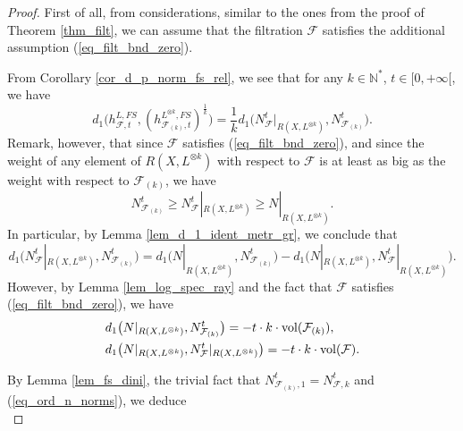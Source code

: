 \documentclass[12pt]{article}
\numberwithin{equation}{section}
\theoremstyle{theorem}
\theoremstyle{definition}
\theoremstyle{remark}
\newcommand{\nat}{\mathbb{N}}
\begin{document}
	\begin{proof}
		First of all, from considerations, similar to the ones from the proof of Theorem \ref{thm_filt}, we can assume that the filtration $\mathcal{F}$ satisfies the additional assumption (\ref{eq_filt_bnd_zero}).
		\par 
		From Corollary \ref{cor_d_p_norm_fs_rel}, we see that for any $k \in \nat^*$, $t \in [0, +\infty[$, we have
		\begin{equation}\label{eq_cont_bergm_1}
			d_1 \big( h^{L, FS}_{\mathcal{F}, t}, (h^{L^{\otimes k}, FS}_{\mathcal{F}_{(k)}, t})^{\frac{1}{k}} \big)
			=
			\frac{1}{k}
			d_1 \big( N^t_{\mathcal{F}}|_{R(X, L^{\otimes k})}, N^t_{\mathcal{F}_{(k)}} \big).
		\end{equation}
		Remark, however, that since $\mathcal{F}$ satisfies (\ref{eq_filt_bnd_zero}), and since the weight of any element of $R(X, L^{\otimes k})$ with respect to $\mathcal{F}$ is at least as big as the weight with respect to $\mathcal{F}_{(k)}$, we have
		\begin{equation}\label{eq_ord_n_norms}
			N^t_{\mathcal{F}_{(k)}} \geq N^t_{\mathcal{F}}|_{R(X, L^{\otimes k})} \geq N|_{R(X, L^{\otimes k})}.
		\end{equation}
		In particular, by Lemma \ref{lem_d_1_ident_metr_gr}, we conclude that 
		\begin{equation}\label{eq_cont_bergm_2}
			d_1 \big( N^t_{\mathcal{F}}|_{R(X, L^{\otimes k})}, N^t_{\mathcal{F}_{(k)}} \big)
			=
			d_1 \big( N|_{R(X, L^{\otimes k})}, N^t_{\mathcal{F}_{(k)}} \big)
			-
			d_1 \big( N|_{R(X, L^{\otimes k})}, N^t_{\mathcal{F}}|_{R(X, L^{\otimes k})} \big).
		\end{equation}
		However, by Lemma \ref{lem_log_spec_ray} and the fact that $\mathcal{F}$ satisfies (\ref{eq_filt_bnd_zero}), we have
		\begin{equation}\label{eq_cont_bergm_3}
		\begin{aligned}
			&
			d_1 \big( N|_{R(X, L^{\otimes k})}, N^t_{\mathcal{F}_{(k)}} \big) = - t \cdot k \cdot {\rm{vol}}(\mathcal{F}_{(k)}),
			\\
			&
			d_1 \big( N|_{R(X, L^{\otimes k})}, N^t_{\mathcal{F}}|_{R(X, L^{\otimes k})} \big) = - t \cdot k \cdot {\rm{vol}}(\mathcal{F}).
		\end{aligned}
		\end{equation}
		\par 
		By Lemma \ref{lem_fs_dini}, the trivial fact that $N^t_{\mathcal{F}_{(k)}, 1} = N^t_{\mathcal{F}, k}$ and (\ref{eq_ord_n_norms}), we deduce
		\begin{equation}

\end{equation}
\end{proof}
\end{document}
